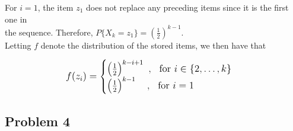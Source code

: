 \documentclass[twoside,11pt]{homework}
\begin{document}
\begin{enumerate}[\bf (a)]
For $i = 1$, the item $z_1$ does not replace any preceding items since it is the first one in \\[0.3em]
the sequence. Therefore,  $ P\{X_k = z_1\} = \left(\frac{1}{2}\right)^{k-1}$. \\[0.1em]

Letting $f$ denote the distribution of the stored items, we then have that 

$$\mathlarger{f(z_i) = 
\begin{cases}
\left( \frac{1}{2} \right)^{k-i+1} \ , \ \text{ for } i \in \{2, \dots, k\} \\
\left( \frac{1}{2} \right)^{k-1}  \ \ \ , \ \text{ for } i = 1
\end{cases}}
$$

\end{enumerate}


\subsection*{Problem 4}
\end{document}
